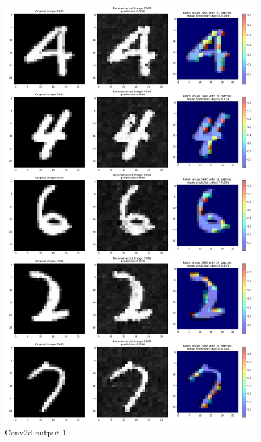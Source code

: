 \documentclass[12pt]{article}
\begin{document}
\begin{figure}[H]
    \centering
    \includegraphics[width=0.8\linewidth]{../fig-mask-collection/ID_2968_Original_Reconstructed_Patch_1.png} %
    \caption{Conv2d output 1 }
    \label{fig:exp1}
\end{figure}
\end{document}
